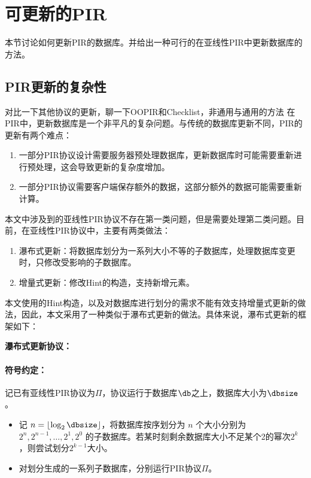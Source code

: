 \section{可更新的PIR}
\label{sec:handling-updates}
本节讨论如何更新PIR的数据库。并给出一种可行的在亚线性PIR中更新数据库的方法。

\subsection{PIR更新的复杂性}

{对比一下其他协议的更新，聊一下OOPIR和Checklist，非通用与通用的方法}
在PIR中，更新数据库是一个非平凡的复杂问题。与传统的数据库更新不同，PIR的更新有两个难点：
\begin{enumerate}
    \item 一部分PIR协议设计需要服务器预处理数据库，更新数据库时可能需要重新进行预处理，这会导致更新的复杂度增加。
    \item 一部分PIR协议需要客户端保存额外的数据，这部分额外的数据可能需要重新计算。
\end{enumerate}

本文中涉及到的亚线性PIR协议不存在第一类问题，但是需要处理第二类问题。目前，在亚线性PIR协议中，主要有两类做法：
\begin{enumerate}
    \item 瀑布式更新\cite{Checklist}：将数据库划分为一系列大小不等的子数据库，处理数据库变更时，只修改受影响的子数据库。
    \item 增量式更新\cite{USENIX:MZRA22}：修改Hint的构造，支持新增元素。
\end{enumerate}

本文使用的Hint构造，以及对数据库进行划分的需求不能有效支持增量式更新的做法，因此，本文采用了一种类似于瀑布式更新的做法。具体来说，瀑布式更新的框架如下：

    \begin{mdframed}
    \centering
    \textbf{瀑布式更新协议：}
        \raggedright
        \paragraph{符号约定：} 记已有亚线性PIR协议为$\Pi$，协议运行于数据库$\db$之上，数据库大小为$\dbsize$。
        \begin{itemize}
            \item 记 $n = \lfloor\log_2{\dbsize}\rfloor$，将数据库按序划分为 $n$ 个大小分别为 $2^n, 2^{n-1}, \dots, 2^1, 2^0$ 的子数据库。若某时刻剩余数据库大小不足某个2的幂次$2^k$，则尝试划分$2^{k-1}$大小。
            \item 对划分生成的一系列子数据库，分别运行PIR协议$\Pi$。
        \end{itemize}
    \end{mdframed}
    \label{fig:checklist}

